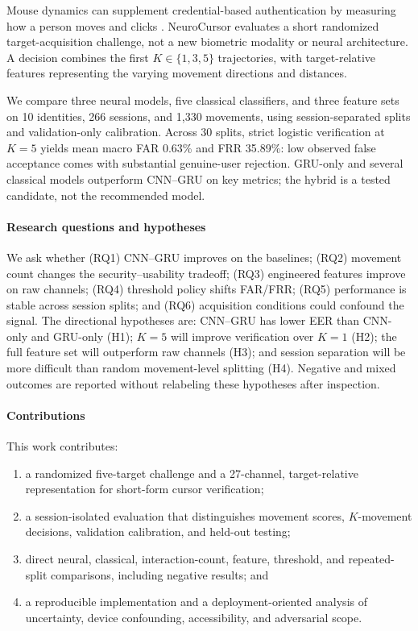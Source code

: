 \documentclass[conference]{IEEEtran}
\begin{document}
Mouse dynamics can supplement credential-based authentication by measuring
how a person moves and clicks \cite{nistBiometrics,khanMouseSurvey}.
NeuroCursor evaluates a short randomized target-acquisition challenge, not a
new biometric modality or neural architecture. A decision combines the first
$K\in\{1,3,5\}$ trajectories, with target-relative features representing the
varying movement directions and distances.

We compare three neural models, five classical classifiers, and three feature
sets on 10 identities, 266 sessions, and 1,330 movements, using session-separated
splits and validation-only calibration. Across 30 splits, strict logistic
verification at $K=5$ yields mean macro FAR 0.63\% and FRR 35.89\%: low
observed false acceptance comes with substantial genuine-user rejection.
GRU-only and several classical models outperform CNN--GRU on key metrics;
the hybrid is a tested candidate, not the recommended model.

\paragraph{Research questions and hypotheses}
We ask whether (RQ1) CNN--GRU improves on the baselines; (RQ2) movement count
changes the security--usability tradeoff; (RQ3) engineered features improve on
raw channels; (RQ4) threshold policy shifts FAR/FRR; (RQ5) performance is stable
across session splits; and (RQ6) acquisition conditions could confound the
signal. The directional hypotheses are: CNN--GRU has lower EER than CNN-only and GRU-only
(H1); $K=5$ will improve verification over $K=1$ (H2); the full feature set will
outperform raw channels (H3); and session separation will be more difficult than
random movement-level splitting (H4). Negative and mixed outcomes are reported
without relabeling these hypotheses after inspection.

\paragraph{Contributions}
This work contributes:
\begin{enumerate}
    \item a randomized five-target challenge and a 27-channel,
    target-relative representation for short-form cursor verification;
    \item a session-isolated evaluation that distinguishes movement scores,
    $K$-movement decisions, validation calibration, and held-out testing;
    \item direct neural, classical, interaction-count, feature, threshold, and
    repeated-split comparisons, including negative results; and
    \item a reproducible implementation and a deployment-oriented analysis of
    uncertainty, device confounding, accessibility, and adversarial scope.
\end{enumerate}
\end{document}
